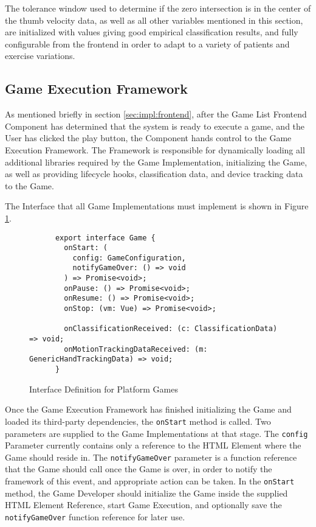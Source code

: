 The tolerance window used to determine if the zero intersection is in the center of the thumb velocity data, as well as all other variables mentioned in this section, are initialized with values giving good empirical classification results, and fully configurable from the frontend in order to adapt to a variety of patients and exercise variations.


\subsection{Game Execution Framework}
\label{sec:impl:gameexec}

As mentioned briefly in section \ref{sec:impl:frontend}, after the Game List Frontend Component has determined that the system is ready to execute a game, and the User has clicked the play button, the Component hands control to the Game Execution Framework. The Framework is responsible for dynamically loading all additional libraries required by the Game Implementation, initializing the Game, as well as providing lifecycle hooks, classification data, and device tracking data to the Game.

The Interface that all Game Implementations must implement is shown in Figure \ref{fig:game-interface}. 

\begin{figure}
\begin{verbatim}
      export interface Game {
        onStart: (
          config: GameConfiguration,
          notifyGameOver: () => void
        ) => Promise<void>;
        onPause: () => Promise<void>;
        onResume: () => Promise<void>;
        onStop: (vm: Vue) => Promise<void>;
      
        onClassificationReceived: (c: ClassificationData) => void;
        onMotionTrackingDataReceived: (m: GenericHandTrackingData) => void;
      }
\end{verbatim}
\caption{Interface Definition for Platform Games}
\label{fig:game-interface}
\end{figure}

Once the Game Execution Framework has finished initializing the Game and loaded its third-party dependencies, the \texttt{onStart} method is called. Two parameters are supplied to the Game Implementations at that stage. The \texttt{config} Parameter currently contains only a reference to the HTML Element where the Game should reside in. The \texttt{notifyGameOver} parameter is a function reference that the Game should call once the Game is over, in order to notify the framework of this event, and appropriate action can be taken. In the \texttt{onStart} method, the Game Developer should initialize the Game inside the supplied HTML Element Reference, start Game Execution, and optionally save the \texttt{notifyGameOver} function reference for later use.

